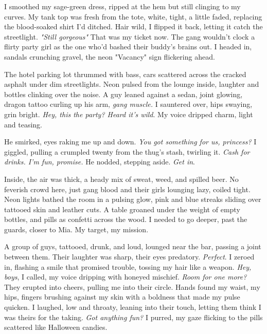 \documentclass[12pt,oneside]{book}
\begin{document}
I smoothed my sage-green dress, ripped at the hem but still clinging to my curves. My tank top was fresh from the tote, white, tight, a little faded, replacing the blood-soaked shirt I’d ditched. Hair wild, I flipped it back, letting it catch the streetlight. \textit{"Still gorgeous"} That was my ticket now. The gang wouldn’t clock a flirty party girl as the one who’d bashed their buddy’s brains out. I headed in, sandals crunching gravel, the neon "Vacancy" sign flickering ahead.

The hotel parking lot thrummed with bass, cars scattered across the cracked asphalt under dim streetlights. Neon pulsed from the lounge inside, laughter and bottles clinking over the noise. A guy leaned against a sedan, joint glowing, dragon tattoo curling up his arm, \textit{gang muscle.} I sauntered over, hips swaying, grin bright. \textit{Hey, this the party? Heard it’s wild}. My voice dripped charm, light and teasing.

He smirked, eyes raking me up and down. \textit{You got something for us, princess?} I giggled, pulling a crumpled twenty from the thug’s stash, twirling it. \textit{Cash for drinks. I’m fun, promise.} He nodded, stepping aside. \textit{Get in}.

Inside, the air was thick, a heady mix of sweat, weed, and spilled beer. No feverish crowd here, just gang blood and their girls lounging lazy, coiled tight. Neon lights bathed the room in a pulsing glow, pink and blue streaks sliding over tattooed skin and leather cuts. A table groaned under the weight of empty bottles, and pills as confetti across the wood. I needed to go deeper, past the guards, closer to Mia. My target, my mission.

A group of guys, tattooed, drunk, and loud, lounged near the bar, passing a joint between them. Their laughter was sharp, their eyes predatory. \textit{Perfect}. I zeroed in, flashing a smile that promised trouble, tossing my hair like a weapon. \textit{Hey, boys}, I called, my voice dripping with honeyed mischief. \textit{Room for one more?} They erupted into cheers, pulling me into their circle. Hands found my waist, my hips, fingers brushing against my skin with a boldness that made my pulse quicken. I laughed, low and throaty, leaning into their touch, letting them think I was theirs for the taking. \textit{Got anything fun?} I purred, my gaze flicking to the pills scattered like Halloween candies.
\end{document}
